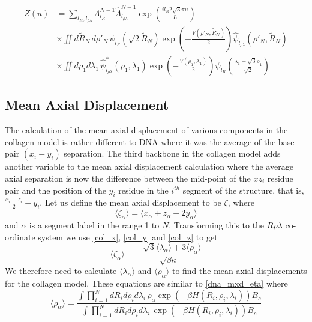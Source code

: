 %
\begin{align}\label{col_hyp_part_final}
Z\left(u\right)&=\sum_{l_R,l_{\rho\lambda}}\Lambda_{l_{R}}^{N-1}\hat{\Lambda}_{l_{\rho\lambda}}^{N-1}\exp\left(\frac{il_R2\sqrt{3}\pi u}{L}\right)\nonumber\\
&\times\iint d\tilde{R}_N\,d\rho'_N\,\psi_{l_R}\left(\sqrt{2}\tilde{R}_{N}\right)\exp\left(-\frac{V\left(\rho'_{N},\tilde{R}_{N}\right)}{2}\right)\hat{\psi}_{l_{\rho\lambda}}\left(\rho'_{N},\tilde{R}_{N}\right)\nonumber\\
&\times\iint d\rho_1d\lambda_1\,\hat{\psi}^{*}_{l_{\rho\lambda}}\left(\rho_{1},\lambda_{1}\right)\exp\left(-\frac{V\left(\rho_{1},\lambda_{1}\right)}{2}\right)\psi_{l_R}\left(\frac{\lambda_1 + \sqrt{3}\rho_1}{\sqrt{2}}\right)
\end{align}
%
\subsection{Mean Axial Displacement}
%
The calculation of the mean axial displacement of various components in the collagen model is rather different to DNA where it was the average of the base-pair $(x_{i}-y_{i})$ separation. 
The third backbone in the collagen model adds another variable to the mean axial displacement calculation where the average axial separation is now the difference between the mid-point of the $xz_{i}$ residue pair and the position of the $y_{i}$ residue in the $i^{th}$ segment of the structure, that is, $\frac{x_{i}+z_{i}}{2}-y_{i}$. Let us define the mean axial displacement to be $\zeta$, where
%
\begin{equation}
\label{col_mxd}
\langle\zeta_\alpha\rangle = \langle x_\alpha+z_\alpha-2y_\alpha\rangle
\end{equation}
%
and $\alpha$ is a segment label in the range 1 to $N$. Transforming this to the $R\rho\lambda$ co-ordinate system we use \eqref{col_x}, \eqref{col_y} and \eqref{col_z} to get
%
\begin{equation}
\label{col_mxd2}
\langle\zeta_{\alpha}\rangle = \frac{-\sqrt{3}\langle\lambda_{\alpha}\rangle+3\langle\rho_{\alpha}\rangle}{\sqrt{\beta\kappa}}
\end{equation}
%
We therefore need to calculate $\langle\lambda_\alpha\rangle$ and $\langle\rho_\alpha\rangle$ to find the mean axial displacements for the collagen model. These equations are similar to \eqref{dna_mxd_eta} where
%
\begin{equation}
\label{col_mxd_rho}
\langle\rho_{\alpha}\rangle=\frac{\int \prod^{N}_{i=1}dR_{i}d\rho_{i}d\lambda_{i}\,\rho_{\alpha}\exp\left(-\beta H\left(R_{i},\rho_{i},\lambda_{i}\right)\right)B_c}{\int \prod^{N}_{i=1}dR_{i}d\rho_{i}d\lambda_{i}\,\exp\left(-\beta H\left(R_{i},\rho_{i},\lambda_{i}\right)\right)B_c}
\end{equation}
